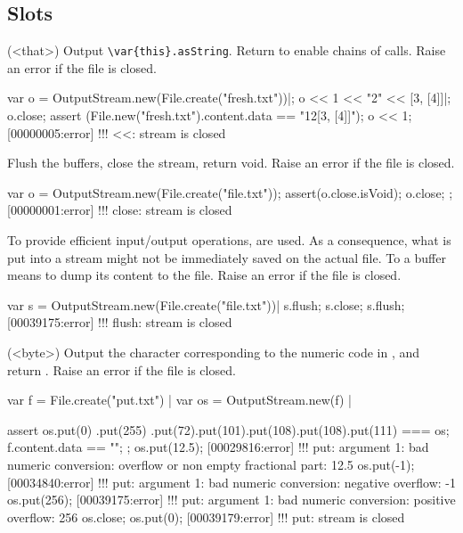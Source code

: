 \subsection{Slots}

\begin{urbiscriptapi}
\item[<<](<that>)%
  Output \lstinline|\var{this}.asString|.  Return \this to
  enable chains of calls.  Raise an error if the file is closed.
\begin{urbiscript}
var o = OutputStream.new(File.create("fresh.txt"))|;
o << 1 << "2" << [3, [4]]|;
o.close;
assert (File.new("fresh.txt").content.data == "12[3, [4]]");
o << 1;
[00000005:error] !!! <<: stream is closed
\end{urbiscript}

\item[close] Flush the buffers, close the stream, return void.  Raise an
  error if the file is closed.
\begin{urbiscript}
{
  var o = OutputStream.new(File.create("file.txt"));
  assert(o.close.isVoid);
  o.close;
};
[00000001:error] !!! close: stream is closed
\end{urbiscript}

\item[flush]%
  To provide efficient input/output operations,  are
  used.  As a consequence, what is put into a stream might not be
  immediately saved on the actual file.  To  a buffer means to
  dump its content to the file.  Raise an error if the file is closed.
\begin{urbiscript}
var s = OutputStream.new(File.create("file.txt"))|
s.flush;
s.close;
s.flush;
[00039175:error] !!! flush: stream is closed
\end{urbiscript}

\item[put](<byte>)%
  Output the character corresponding to the numeric code  in
  \this, and return \this.  Raise an error if the file is closed.
\begin{urbiscript}
var f = File.create("put.txt") |
var os = OutputStream.new(f) |

assert
{
  os.put(0)
    .put(255)
    .put(72).put(101).put(108).put(108).put(111)
  === os;
  f.content.data == "\0\xffHello";
};
os.put(12.5);
[00029816:error] !!! put: argument 1: bad numeric conversion: overflow or non empty fractional part: 12.5
os.put(-1);
[00034840:error] !!! put: argument 1: bad numeric conversion: negative overflow: -1
os.put(256);
[00039175:error] !!! put: argument 1: bad numeric conversion: positive overflow: 256
os.close;
os.put(0);
[00039179:error] !!! put: stream is closed
\end{urbiscript}

\end{urbiscriptapi}


